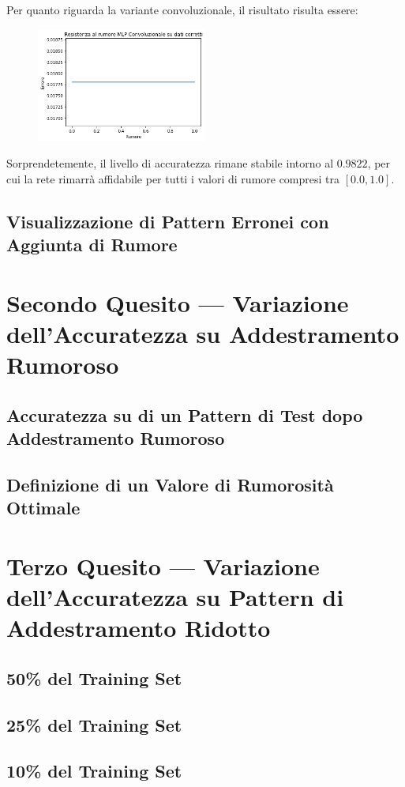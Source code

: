 \documentclass[12pt, a4paper]{article}
\begin{document}
Per quanto riguarda la variante convoluzionale, il risultato risulta essere:
\begin{figure}[H]
    \centering
    \includegraphics[width=0.50\textwidth]{TPConv.png}
\end{figure}

Sorprendetemente, il livello di accuratezza rimane stabile intorno al \(0.9822\), per cui la rete rimarrà affidabile per tutti i valori di rumore compresi tra \([0.0, 1.0]\).\\


\subsection{Visualizzazione di Pattern Erronei con Aggiunta di Rumore}

\newpage
\section{Secondo Quesito --- Variazione dell'Accuratezza su Addestramento Rumoroso}
\subsection{Accuratezza su di un Pattern di Test dopo Addestramento Rumoroso}
\subsection{Definizione di un Valore di Rumorosità Ottimale}

\newpage
\section{Terzo Quesito --- Variazione dell'Accuratezza su Pattern di Addestramento Ridotto}
\subsection{50\% del Training Set}
\subsection{25\% del Training Set}
\subsection{10\% del Training Set}
\end{document}
